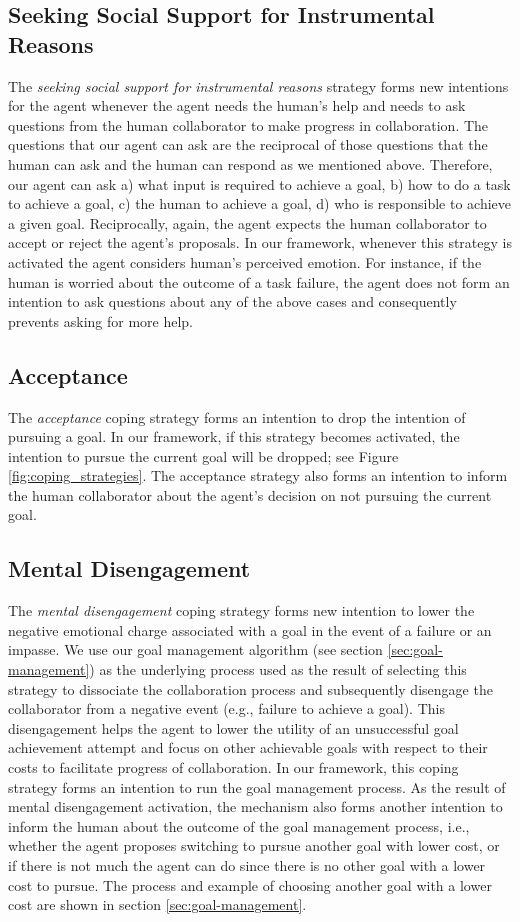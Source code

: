 \documentclass[12pt]{report}
\begin{document}
\subsection{Seeking Social Support for Instrumental Reasons}
The \textit{seeking social support for instrumental reasons} strategy forms new
intentions for the agent whenever the agent needs the human's help and needs to
ask questions from the human collaborator to make progress in collaboration. The
questions that our agent can ask are the reciprocal of those questions that the
human can ask and the human can respond as we mentioned above. Therefore, our
agent can ask a) what input is required to achieve a goal, b) how to do a task
to achieve a goal, c) the human to achieve a goal, d) who is responsible to
achieve a given goal. Reciprocally, again, the agent expects the human
collaborator to accept or reject the agent's proposals. In our framework,
whenever this strategy is activated the agent considers human's perceived
emotion. For instance, if the human is worried about the outcome of a task
failure, the agent does not form an intention to ask questions about any of the
above cases and consequently prevents asking for more help.

\subsection{Acceptance}
The \textit{acceptance} coping strategy forms an intention to drop the
intention of pursuing a goal. In our framework, if this strategy becomes
activated, the intention to pursue the current goal will be dropped; see Figure
\ref{fig:coping_strategies}. The acceptance strategy also forms an intention to
inform the human collaborator about the agent's decision on not pursuing the
current goal.

\subsection{Mental Disengagement}
The \textit{mental disengagement} coping strategy forms new intention to lower
the negative emotional charge associated with a goal in the event of a failure
or an impasse. We use our goal management algorithm (see section
\ref{sec:goal-management}) as the underlying process used as the result of
selecting this strategy to dissociate the collaboration process and subsequently
disengage the collaborator from a negative event (e.g., failure to achieve a
goal). This disengagement helps the agent to lower the utility of an
unsuccessful goal achievement attempt and focus on other achievable goals with
respect to their costs to facilitate progress of collaboration. In our
framework, this coping strategy forms an intention to run the goal management
process. As the result of mental disengagement activation, the mechanism also
forms another intention to inform the human about the outcome of the goal
management process, i.e., whether the agent proposes switching to pursue another
goal with lower cost, or if there is not much the agent can do since there is no
other goal with a lower cost to pursue. The process and example of choosing
another goal with a lower cost are shown in section \ref{sec:goal-management}.
\end{document}
